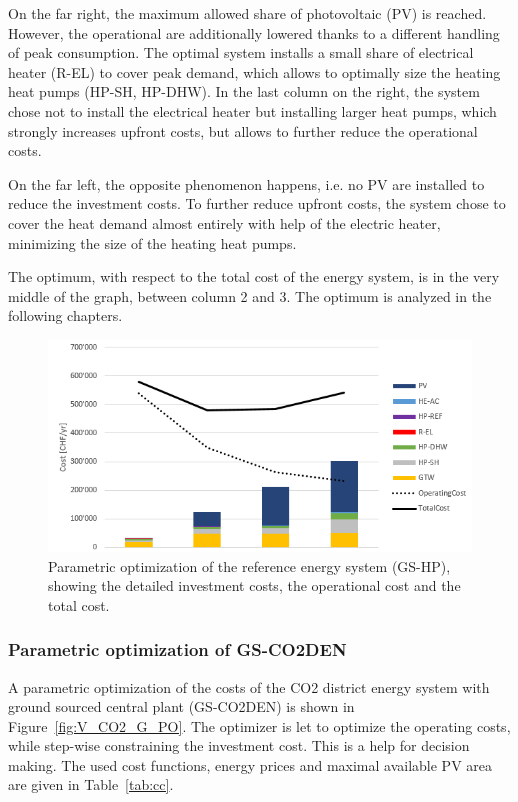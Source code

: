 \documentclass{article}
\begin{document}
On the far right, the maximum allowed share of photovoltaic (PV) is reached. However, the operational are additionally lowered thanks to a different handling of peak consumption. The optimal system installs a small share of electrical heater (R-EL) to cover peak demand, which allows to optimally size the heating heat pumps (HP-SH, HP-DHW). In the last column on the right, the system chose not to install the electrical heater but installing larger heat pumps, which strongly increases upfront costs, but allows to further reduce the operational costs.

On the far left, the opposite phenomenon happens, i.e. no PV are installed to reduce the investment costs. To further reduce upfront costs, the system chose to cover the heat demand almost entirely with help of the electric heater, minimizing the size of the heating heat pumps.

The optimum, with respect to the total cost of the energy system, is in the very middle of the graph, between column 2 and 3. The optimum is analyzed in the following chapters.

\begin{figure}[htp]
	\centering
	\includegraphics[width=1\textwidth]{V_G_PO1.png}
	\caption{Parametric optimization of the reference energy system (GS-HP), showing the detailed investment costs, the operational cost and the total cost.}
	\label{fig:V_G_PO}
\end{figure}

\subsubsection{Parametric optimization of GS-CO2DEN}
A parametric optimization of the costs of the CO2 district energy system with ground sourced central plant (GS-CO2DEN) is shown in Figure~\ref{fig:V_CO2_G_PO}. The optimizer is let to optimize the operating costs, while step-wise constraining the investment cost. This is a help for decision making. The used cost functions, energy prices and maximal available PV area are given in Table~\ref{tab:cc}. \\ 
\end{document}

